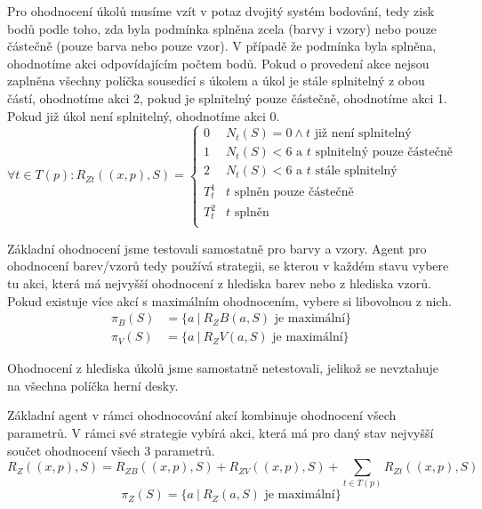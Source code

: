 Pro ohodnocení úkolů musíme vzít v potaz dvojitý systém bodování, tedy zisk bodů podle toho, zda byla podmínka splněna zcela (barvy i vzory) nebo pouze částečně (pouze barva nebo pouze vzor). V případě že podmínka byla splněna, ohodnotíme akci odpovídajícím počtem bodů. Pokud o provedení akce nejsou zaplněna všechny políčka sousedící s úkolem a úkol je stále splnitelný z obou částí, ohodnotíme akci 2, pokud je splnitelný pouze částečně, ohodnotíme akci 1. Pokud již úkol není splnitelný, ohodnotíme akci 0.
\begin{equation}
    \forall t \in T(p): R_{Zt}((x,p),S) =
    \begin{cases}
        0           &N_t(S) = 0 \wedge \text{$t$ již není splnitelný}\\
        1           &N_t(S) < 6 \text{ a $t$ splnitelný pouze částečně}\\
        2           &N_t(S) < 6 \text{ a $t$ stále splnitelný}\\
        T_t^1       &\text{$t$ splněn pouze částečně}\\
        T_t^2       &\text{$t$ splněn}\\
    \end{cases}
\end{equation}

Základní ohodnocení jsme testovali samostatně pro barvy a vzory. 
Agent pro ohodnocení barev/vzorů tedy používá strategii, se kterou v každém stavu vybere tu akci, která má nejvyšší ohodnocení z hlediska barev nebo z hlediska vzorů. Pokud existuje více akcí s maximálním ohodnocením, vybere si libovolnou z nich.
\begin{align}
    \pi_B(S) &= \{a\ |\ R_ZB(a,S) \text{ je maximální}\} \\
    \pi_V(S) &= \{a\ |\ R_ZV(a,S) \text{ je maximální}\}
\end{align}

Ohodnocení z hlediska úkolů jsme samostatně netestovali, jelikož se nevztahuje na všechna políčka herní desky.

Základní agent v rámci ohodnocování akcí kombinuje ohodnocení všech parametrů. V rámci své strategie vybírá akci, která má pro daný stav nejvyšší součet ohodnocení všech 3 parametrů.
\begin{equation}
    R_Z((x,p),S) = R_{ZB}((x,p),S) + R_{ZV}((x,p),S) + \sum_{t \in T(p)} R_{Zt}((x,p),S)
\end{equation}
\begin{equation}
    \pi_Z(S) = \{a\ |\ R_Z(a,S) \text{ je maximální}\}
\end{equation}

